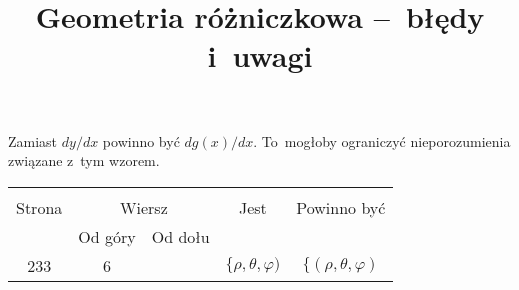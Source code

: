 \documentclass[a4paper,11pt]{article}
\title{Geometria różniczkowa --~błędy i~uwagi}
\begin{document}





\maketitle %









\start {} Zamiast $dy/dx$ powinno być $d g( x )/dx$.
To~mogłoby ograniczyć nieporozumienia związane z~tym wzorem.

\vspace{\spaceFour}







\begin{center}

  \begin{tabular}{|c|c|c|c|c|}
    \hline
    & \multicolumn{2}{c|}{} & & \\
    Strona & \multicolumn{2}{c|}{Wiersz} & Jest
                              & Powinno być \\ \cline{2-3}
    & Od góry & Od dołu & & \\
    \hline
    233 &  6 & & $\{ \rho, \theta, \varphi )$ & $\{ ( \rho, \theta, \varphi )$ \\
    \hline
  \end{tabular}

\end{center}

\vspace{\spaceTwo}
\end{document}
